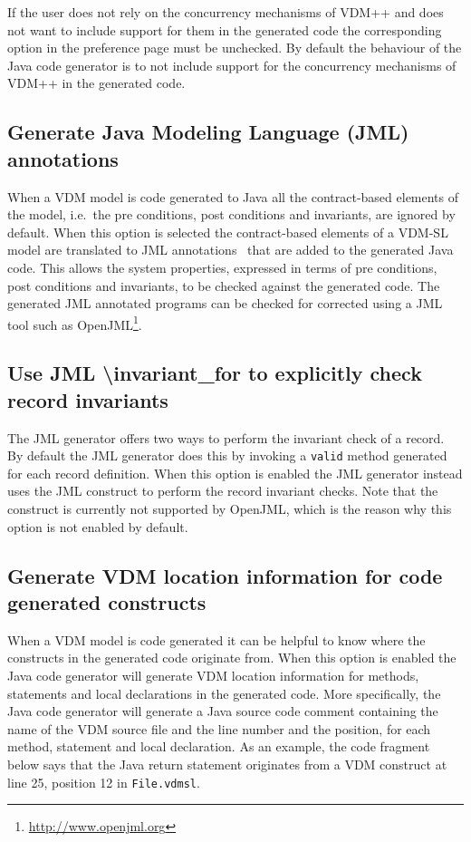 If the user does not rely on the concurrency mechanisms of VDM++ and
does not want to include support for them in the generated code the
corresponding option in the preference page must be unchecked. By
default the behaviour of the Java code generator is to not include
support for the concurrency mechanisms of VDM++ in the generated code.

\subsection{Generate Java Modeling Language (JML) annotations}

When a VDM model is code generated to Java all the contract-based
elements of the model, i.e.\ the pre conditions, post conditions and
invariants, are ignored by default. When this option is selected the
contract-based elements of a VDM-SL model are translated to JML
annotations~\cite{Burdy&05} that are added to the generated Java
code. This allows the system properties, expressed in terms of pre
conditions, post conditions and invariants, to be checked against the
generated code. The generated JML annotated programs can be checked
for corrected using a JML tool such as
OpenJML\footnote{\url{http://www.openjml.org}}.\\

\subsection{Use JML \textbackslash invariant\_for to explicitly check record invariants}
\label{sec:inv-for}

The JML generator offers two ways to perform the invariant check of a
record. By default the JML generator does this by invoking a
\texttt{valid} method generated for each record definition. When this
option is enabled the JML generator instead uses the JML
 construct to perform the record invariant
checks. Note that the  construct is currently
not supported by OpenJML, which is the reason why this option is not
enabled by default.

\subsection{Generate VDM location information for code generated constructs}
\label{sec:vdm-loc}

When a VDM model is code generated it can be helpful to know where the
constructs in the generated code originate from. When this option is
enabled the Java code generator will generate VDM location information
for methods, statements and local declarations in the generated
code. More specifically, the Java code generator will generate a Java
source code comment containing the name of the VDM source file and the
line number and the position, for each method, statement and local
declaration. As an example, the code fragment below says that the Java
return statement originates from a VDM construct at line 25,
position 12 in \texttt{File.vdmsl}.\\

